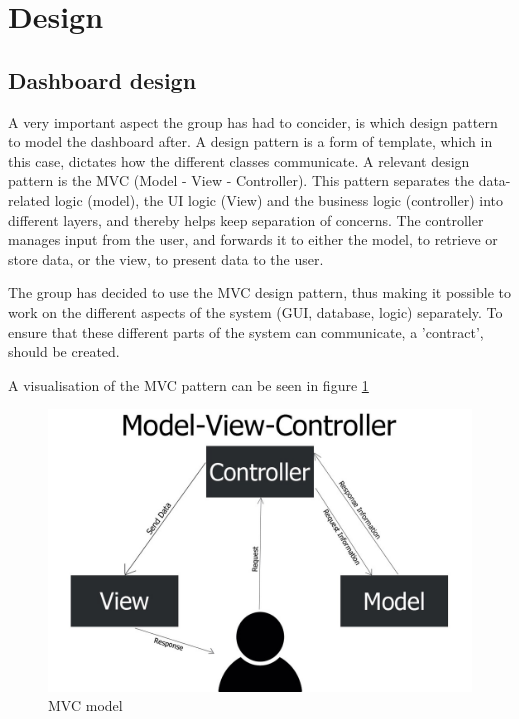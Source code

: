 \section{Design}

\subsection{Dashboard design}
A very important aspect the group has had to concider, is which design pattern
to model the dashboard after. A design pattern is a form of template, which in
this case, dictates how the different classes communicate. A relevant design
pattern is the MVC (Model - View - Controller). This pattern separates the
data-related logic (model), the UI logic (View) and the business logic 
(controller) into different layers, and thereby helps keep separation of
concerns. The controller manages input from the user, and forwards it to either
the model, to retrieve or store data, or the view, to present data to the user.

The group has decided to use the MVC design pattern, thus making it possible to
work on the different aspects of the system (GUI, database, logic) separately.
To ensure that these different parts of the system can communicate, a
'contract', should be created.

A visualisation of the MVC pattern can be seen in figure \ref{figure:MVC_model}

\begin{figure}[ht]
    \centering
    \includegraphics[scale=0.35]{images/MVC_model.jpg}
    \caption{MVC model}
    \label{figure:MVC_model}
\end{figure}